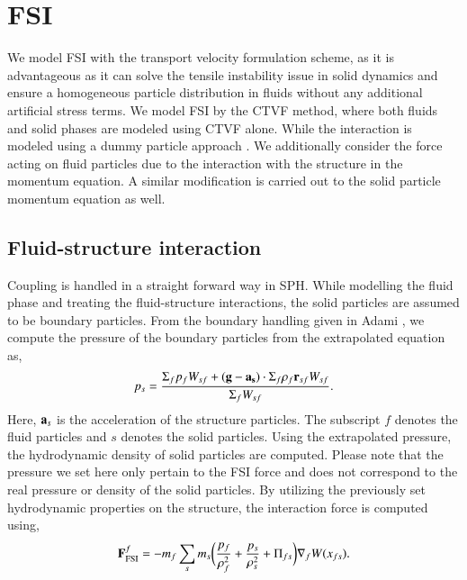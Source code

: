 \FloatBarrier%
\chapter{FSI}
\label{sec:fsi}
We model FSI with the transport velocity formulation scheme, as it is
advantageous as it can solve the tensile instability issue in solid dynamics and
ensure a homogeneous particle distribution in fluids without any additional
artificial stress terms. We model FSI by the CTVF method, where both fluids and
solid phases are modeled using CTVF alone. While the interaction is modeled
using a dummy particle approach \citep{Adami2011}. We additionally consider the
force acting on fluid particles due to the interaction with the structure in the
momentum equation. A similar modification is carried out to the solid particle
momentum equation as well.

\section{Fluid-structure interaction}\label{subsec:fsi}
Coupling is handled in a straight forward way in SPH. While modelling the fluid
phase and treating the fluid-structure interactions, the solid particles are
assumed to be boundary particles. From the boundary handling given in Adami
\citep{Adami2012}, we compute the pressure of the boundary particles from
the extrapolated equation as,
\begin{equation}
  \label{eq:fsi:pressure-bc}
  p_s = \frac{\Sigma_f p_f W_{sf} + (\mathbf{g} - \mathbf{a}_{\mathbf{s}}) \cdot \Sigma_f
    \rho_f \mathbf{r}_{sf} W_{sf}}{\Sigma_f W_{sf}}.
\end{equation}
Here, $\mathbf{a}_s$ is the acceleration of the structure particles. The subscript
$f$ denotes the fluid particles and $s$ denotes the solid particles. Using the
extrapolated pressure, the hydrodynamic density of solid particles are
computed. Please note that the pressure we set here only pertain to the
FSI force and does not correspond to the real pressure or density of the
solid particles. By utilizing the previously set hydrodynamic properties on
the structure, the interaction force is computed using,
\begin{equation}
  \mathbf{F}_{\text{FSI}}^f = -m_f \sum_{s} m_s \bigg(\frac{p_f}{\rho_{f}^2} +
  \frac{p_s}{\rho_{s}^2} + \Pi_{fs} \bigg) \nabla_{f} W(x_{fs}).
\end{equation}



